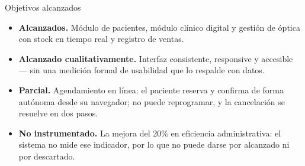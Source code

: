 \documentclass[11pt,aspectratio=169]{beamer}
\begin{document}
\begin{frame}{Objetivos alcanzados}
  \begin{itemize}
    \item[\textcolor{sigaVerde}{$\blacksquare$}] \textbf{Alcanzados.} Módulo de pacientes,
      módulo clínico digital y gestión de óptica con stock en tiempo real y registro
      de ventas.
    \item[\textcolor{sigaVerde}{$\blacksquare$}] \textbf{Alcanzado cualitativamente.}
      Interfaz consistente, responsive y accesible --- sin una medición formal de
      usabilidad que lo respalde con datos.
    \item[\textcolor{sigaAmbar}{$\blacksquare$}] \textbf{Parcial.} Agendamiento en línea:
      el paciente reserva y confirma de forma autónoma desde su navegador; no puede
      reprogramar, y la cancelación se resuelve en dos pasos.
    \item[\textcolor{sigaAmbar}{$\blacksquare$}] \textbf{No instrumentado.} La mejora
      del 20\% en eficiencia administrativa: el sistema no mide ese indicador, por lo
      que no puede darse por alcanzado ni por descartado.
  \end{itemize}
\end{frame}
\end{document}
